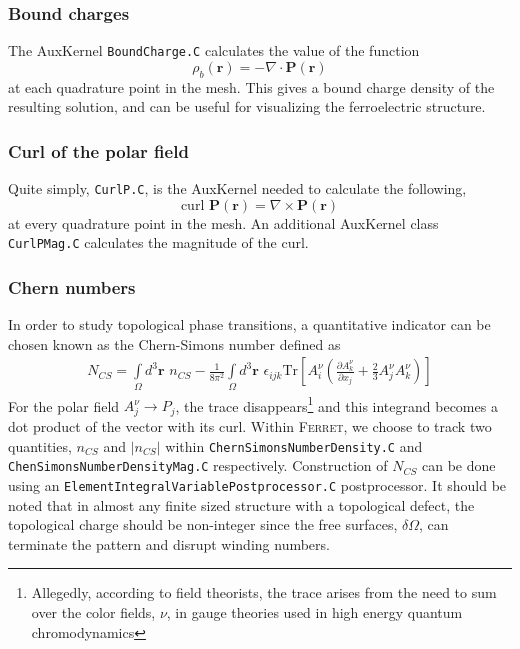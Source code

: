 \documentclass[16pt]{article} %
\begin{document}
\subsubsection{Bound charges}
%
The AuxKernel \texttt{BoundCharge.C} calculates the value of the function
%
$$\rho_b (\textbf{r} ) = - \nabla \cdot \textbf{P} (\textbf{r} )$$
%
at each quadrature point in the mesh.
%
This gives a bound charge density of the resulting solution, and can be useful for visualizing the ferroelectric structure.
%
\subsubsection{Curl of the polar field}
%
Quite simply, \texttt{CurlP.C}, is the AuxKernel needed to calculate the following,
%
$$\mathrm{curl} \,\, \textbf{P} (\textbf{r}) =  \nabla \times \textbf{P} (\textbf{r})$$
%
at every quadrature point in the mesh. An additional AuxKernel class \texttt{CurlPMag.C} calculates the magnitude of the curl.
%
\subsubsection{Chern numbers}
%
In order to study topological phase transitions, a quantitative indicator can be chosen known as the Chern-Simons number defined as
%
\begin{align}\nonumber
N_{CS} = \int\limits_\Omega d^3 \textbf{r} \,\,  n_{CS} - \frac{1}{8 \pi^2} \int\limits_\Omega d^3 \textbf{r} \,\, \epsilon_{ijk} \mathrm{Tr} \left[A_i^\nu \left(\frac{\partial A_k^\nu}{\partial x_j} + \frac{2}{3} A_j^\nu A_k^\nu \right) \right]
\end{align}
%
For the polar field $A_j^\nu \to P_j$, the trace disappears\footnote{Allegedly, according to field theorists, the trace arises from the need to sum over the color fields, $\nu$, in gauge theories used in high energy quantum chromodynamics} and this integrand becomes a dot product of the vector with its curl. %
%
Within \textsc{Ferret}, we choose to track two quantities, $n_{CS}$ and $|n_{CS}|$ within \texttt{ChernSimonsNumberDensity.C} and \texttt{ChenSimonsNumberDensityMag.C} respectively. Construction of $N_{CS}$ can be done using an 
\texttt{ElementIntegralVariablePostprocessor.C} postprocessor.
%
It should be noted that in almost any finite sized structure with a topological defect, the topological charge should be non-integer since the free surfaces, $\delta \Omega$, can terminate the pattern and disrupt winding numbers.
% 
\end{document}
